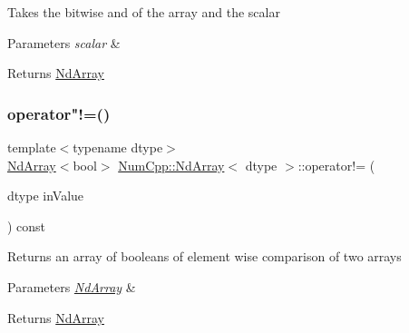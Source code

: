 Takes the bitwise and of the array and the scalar


\begin{DoxyParams}{Parameters}
{\em scalar} & \\
\hline
\end{DoxyParams}
\begin{DoxyReturn}{Returns}
\mbox{\hyperlink{class_num_cpp_1_1_nd_array}{Nd\+Array}} 
\end{DoxyReturn}
\mbox{\label{class_num_cpp_1_1_nd_array_aa352a2617a9558e66238f90114956807}} 
\subsubsection{\texorpdfstring{operator"!=()}{operator!=()}\hspace{0.1cm}{\footnotesize\ttfamily [1/2]}}
{\footnotesize\ttfamily template$<$typename dtype$>$ \\
\mbox{\hyperlink{class_num_cpp_1_1_nd_array}{Nd\+Array}}$<$bool$>$ \mbox{\hyperlink{class_num_cpp_1_1_nd_array}{Num\+Cpp\+::\+Nd\+Array}}$<$ dtype $>$\+::operator!= (\begin{DoxyParamCaption}\item[{dtype}]{in\+Value }\end{DoxyParamCaption}) const\hspace{0.3cm}{\ttfamily [inline]}}

Returns an array of booleans of element wise comparison of two arrays


\begin{DoxyParams}{Parameters}
{\em \mbox{\hyperlink{class_num_cpp_1_1_nd_array}{Nd\+Array}}} & \\
\hline
\end{DoxyParams}
\begin{DoxyReturn}{Returns}
\mbox{\hyperlink{class_num_cpp_1_1_nd_array}{Nd\+Array}} 
\end{DoxyReturn}
\mbox{\label{class_num_cpp_1_1_nd_array_afcefa104f1f9ab834db223ca2a247ee7}} 
